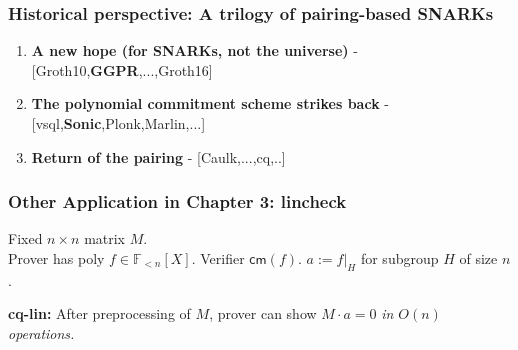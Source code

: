 \documentclass[shadesubsections,compress,14pt,mathserif]{beamer}
\newcommand{\F}{\ensuremath{{\mathbb F}}}
\newcommand{\cm}{\ensuremath{\mathsf{cm}}}
\newcommand{\defeq}{\ensuremath{:=}}
\newcommand{\polysofdeg}[1]{\F_{< #1}[X]}
\newcommand{\nl}{\\ \pause \vspace{0.2in}}
\begin{document}
\begin{frame}
\frametitle{Historical perspective: A trilogy of pairing-based SNARKs}\pause

\begin{enumerate}
 \item \textbf{A new hope (for SNARKs, not the universe)} - [Groth10,\textbf{GGPR},...,Groth16]\pause 
 \vspace{0.2in}
 \item  \textbf{The polynomial commitment scheme strikes back} - [vsql,\textbf{Sonic},Plonk,Marlin,...]\pause 
 \vspace{0.2in}
 
 \item  \textbf{Return of the pairing} - [Caulk,...,cq,..]
 
\end{enumerate}

\end{frame}
\begin{frame}
\frametitle{Other Application in Chapter 3: lincheck }
Fixed $n\times n$ matrix $M$.\nl
Prover has poly $f\in \polysofdeg{n}$.
Verifier $\cm(f)$.
$a\defeq f|_H$ for subgroup $H$ of size $n$.\nl

\textbf{cq-lin:} After preprocessing of $M$, prover can show $M\cdot a =0$
\emph{in $O(n)$ operations.}\nl



\end{frame}
\end{document}
